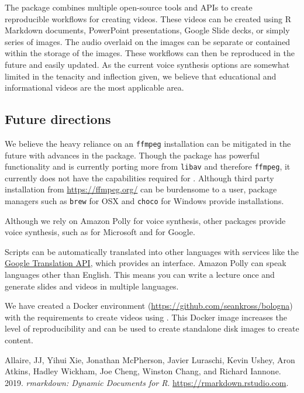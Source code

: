The  package combines multiple open-source tools and APIs to
create reproducible workflows for creating videos. These videos can be
created using R Markdown documents, PowerPoint presentations, Google
Slide decks, or simply series of images. The audio overlaid on the
images can be separate or contained within the storage of the images.
These workflows can then be reproduced in the future and easily updated.
As the current voice synthesis options are somewhat limited in the
tenacity and inflection given, we believe that educational and
informational videos are the most applicable area.

\hypertarget{future-directions}{%
\subsection{Future directions}\label{future-directions}}

We believe the heavy reliance on an \texttt{ffmpeg} installation can be
mitigated in the future with advances in the  package. Though
the  package has powerful functionality and is currently porting
more from \texttt{libav} and therefore \texttt{ffmpeg}, it currently
does not have the capabilities required for . Although third
party installation from \url{https://ffmpeg.org/} can be burdensome to a
user, package managers such as \texttt{brew} for OSX and \texttt{choco}
for Windows provide installations.

Although we rely on Amazon Polly for voice synthesis, other packages
provide voice synthesis, such as  for Microsoft and
 for Google.

Scripts can be automatically translated into other languages with
services like the \href{https://cloud.google.com/translate/docs/}{Google
Translation API}, which  provides an interface.
Amazon Polly can speak languages other than English. This means you can
write a lecture once and generate slides and videos in multiple
languages.

We have created a Docker environment
(\url{https://github.com/seankross/bologna}) with the requirements to
create videos using . This Docker image increases the level of
reproducibility and can be used to create standalone disk images to
create content.



\hypertarget{refs}{}
\leavevmode\hypertarget{ref-rmarkdown}{}%
Allaire, JJ, Yihui Xie, Jonathan McPherson, Javier Luraschi, Kevin
Ushey, Aron Atkins, Hadley Wickham, Joe Cheng, Winston Chang, and
Richard Iannone. 2019. \emph{rmarkdown: Dynamic Documents for R}.
\url{https://rmarkdown.rstudio.com}.

